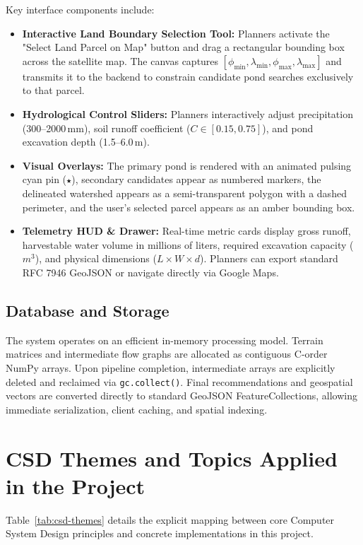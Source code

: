 \documentclass[manuscript,screen,review]{acmart}
\begin{document}
Key interface components include:
\begin{itemize}
    \item \textbf{Interactive Land Boundary Selection Tool:} Planners activate the "Select Land Parcel on Map" button and drag a rectangular bounding box across the satellite map. The canvas captures $[\phi_{\min}, \lambda_{\min}, \phi_{\max}, \lambda_{\max}]$ and transmits it to the backend to constrain candidate pond searches exclusively to that parcel.
    \item \textbf{Hydrological Control Sliders:} Planners interactively adjust precipitation (300--2000\,mm), soil runoff coefficient ($C \in [0.15, 0.75]$), and pond excavation depth (1.5--6.0\,m).
    \item \textbf{Visual Overlays:} The primary pond is rendered with an animated pulsing cyan pin (\texttt{★}), secondary candidates appear as numbered markers, the delineated watershed appears as a semi-transparent polygon with a dashed perimeter, and the user's selected parcel appears as an amber bounding box.
    \item \textbf{Telemetry HUD \& Drawer:} Real-time metric cards display gross runoff, harvestable water volume in millions of liters, required excavation capacity ($m^3$), and physical dimensions ($L \times W \times d$). Planners can export standard RFC 7946 GeoJSON or navigate directly via Google Maps.
\end{itemize}

\subsection{Database and Storage}
The system operates on an efficient in-memory processing model. Terrain matrices and intermediate flow graphs are allocated as contiguous C-order NumPy arrays. Upon pipeline completion, intermediate arrays are explicitly deleted and reclaimed via \texttt{gc.collect()}. Final recommendations and geospatial vectors are converted directly to standard GeoJSON FeatureCollections, allowing immediate serialization, client caching, and spatial indexing.

\section{CSD Themes and Topics Applied in the Project}
\label{sec:csd-themes}

Table~\ref{tab:csd-themes} details the explicit mapping between core Computer System Design principles and concrete implementations in this project.
\end{document}
